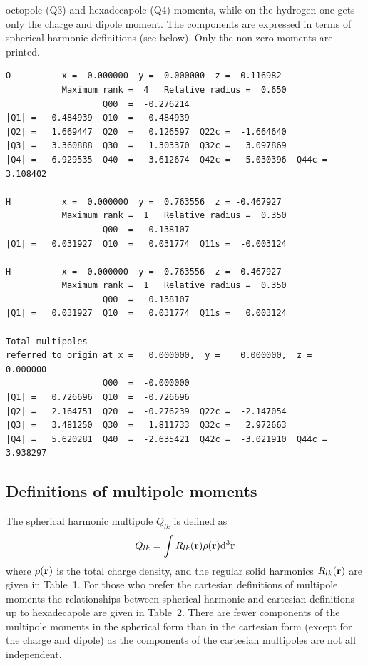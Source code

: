 \documentclass[12pt,txfonts]{paper}
\renewcommand{\baselinestretch}{1.05}
\begin{document}
octopole (Q3) and hexadecapole (Q4) moments, while on the hydrogen one
gets only the charge and dipole moment. The components are expressed 
in terms of spherical harmonic definitions (see below). Only the
non-zero moments are printed.
\small
\renewcommand{\baselinestretch}{1.0}\small
\begin{verbatim}
O          x =  0.000000  y =  0.000000  z =  0.116982
           Maximum rank =  4   Relative radius =  0.650
                   Q00  =  -0.276214
|Q1| =   0.484939  Q10  =  -0.484939
|Q2| =   1.669447  Q20  =   0.126597  Q22c =  -1.664640
|Q3| =   3.360888  Q30  =   1.303370  Q32c =   3.097869
|Q4| =   6.929535  Q40  =  -3.612674  Q42c =  -5.030396  Q44c =   3.108402

H          x =  0.000000  y =  0.763556  z = -0.467927
           Maximum rank =  1   Relative radius =  0.350
                   Q00  =   0.138107
|Q1| =   0.031927  Q10  =   0.031774  Q11s =  -0.003124

H          x = -0.000000  y = -0.763556  z = -0.467927
           Maximum rank =  1   Relative radius =  0.350
                   Q00  =   0.138107
|Q1| =   0.031927  Q10  =   0.031774  Q11s =   0.003124

Total multipoles
referred to origin at x =   0.000000,  y =    0.000000,  z =    0.000000
                   Q00  =  -0.000000
|Q1| =   0.726696  Q10  =  -0.726696
|Q2| =   2.164751  Q20  =  -0.276239  Q22c =  -2.147054
|Q3| =   3.481250  Q30  =   1.811733  Q32c =   2.972663
|Q4| =   5.620281  Q40  =  -2.635421  Q42c =  -3.021910  Q44c =   3.938297
\end{verbatim}

\clearpage
\normalsize
\subsection{Definitions of multipole moments}
\label{multipoles}

The spherical
harmonic multipole $Q_{lk}$ is defined as
\begin{equation*}
Q_{lk} = \int R_{lk}({\bf r}) \rho({\bf r}) {\rm d}^3{\bf r}
\end{equation*}
where $\rho({\bf r})$ is the total charge density, and the regular
solid harmonics $R_{lk}({\bf r})$ are given in Table~1. For those who
prefer the cartesian definitions of multipole moments the relationships
between spherical harmonic and cartesian definitions up to
hexadecapole are given in Table~2.
There are fewer components of the multipole moments in the spherical form
than in the cartesian form (except for the charge and dipole) as the
components of the cartesian multipoles are not all independent.
\end{document}
